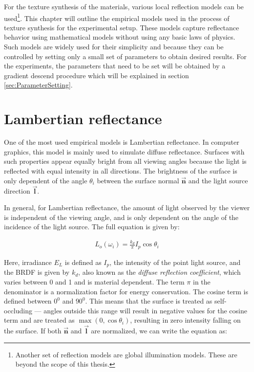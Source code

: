 \hypertarget{empiricalModels}{
}

\noindent For the texture synthesis of the materials, various local reflection models can be used\footnote[1]{Another set of reflection models are global illumination models. These are beyond the scope of this thesis.}. This chapter will outline the empirical models used in the process of texture synthesis for the experimental setup. These models capture reflectance behavior using mathematical models without using any basic laws of physics. Such models are widely used for their simplicity and because they can be controlled by setting only a small set of parameters to obtain desired results. For the experiments, the parameters that need to be set will be obtained by a gradient descend procedure which will be explained in section \ref{sec:ParameterSetting}.

\section{Lambertian reflectance}\label{sec:Lambertian}
	One of the most used empirical models is Lambertian reflectance. In computer graphics, this model is mainly used to simulate diffuse reflectance. Surfaces with such properties appear equally bright from all viewing angles because the light is reflected with equal intensity in all directions. The brightness of the surface is only dependent of the angle $\theta_i$ between the surface normal $\vec{\mathbf{n}}$ and the light source direction $\vec{\mathbf{l}}$. 

In general, for Lambertian reflectance, the amount of light observed by the viewer is independent of the viewing angle, and is only dependent on the angle of the incidence of the light source. The full equation is given by:

		\begin{eqnarray*}
			L_o(\omega_i) = \frac{k_d}{\pi}I_p\cos\theta_i
		\end{eqnarray*}

Here, irradiance $E_L$ is defined as $I_p$, the intensity of the point light source, and the BRDF is given by $k_d$, also known as the {\it diffuse reflection coefficient}, which varies between 0 and 1 and is material dependent. The term $\pi$ in the denominator is a normalization factor for energy conservation. The cosine term is defined between $0^0$ and $90^0$. This means that the surface is treated as self-occluding --- angles outside this range will result in negative values for the cosine term and are treated as $\max({0,\cos\theta_i})$, resulting in zero intensity falling on the surface. If both $\vec{\mathbf{n}}$ and $\vec{\mathbf{l}}$ are normalized, we can write the equation as:

